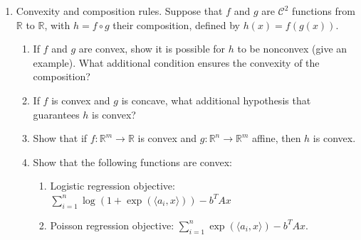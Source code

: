 \documentclass[11pt]{amsart}
\newcommand{\cC}{\mathcal{C}}
\begin{document}
\begin{enumerate}
\begin{enumerate}
\item Any norm (see Chapter 1 for definition of a norm).

  \begin{proof}
    Let $\lVert \cdot \rVert$ be a norm, meaning that it satisfies
    \emph{absolute homogeneity} and the \emph{triangle inequality}. We have that
    \begin{align*}
      \lVert \lambda x + (1 - \lambda)y \rVert
      &\leq \lVert \lambda x \rVert + \lVert (1 - \lambda)y \rVert
      = \lambda \lVert x \rVert + (1 - \lambda)\lVert y \rVert
    \end{align*}
    for all $\lambda \in [0, 1]$, where we first apply the triangle inequality
    and then absolute homogeneity. By defintion, $\lVert \cdot \rVert$ is convex.
  \end{proof}

\end{enumerate}

\bigskip\bigskip




\item  Convexity and composition rules. Suppose that $f$ and $g$ are $\cC^2$ functions from $\mathbb{R}$ to $\mathbb{R}$, with $h = f\circ g$ their composition, defined by 
\(
h(x) = f(g(x)).
\) 
\begin{enumerate}
\item If $f$ and $g$ are convex, show it is possible for $h$ to be nonconvex (give an example). What additional condition ensures 
the convexity of the composition? 
\item If $f$ is convex and $g$ is concave, what additional hypothesis that guarantees $h$ is convex? 
\item Show that if $f: \mathbb{R}^m \rightarrow \mathbb{R}$ is convex and $g: \mathbb{R}^n \rightarrow \mathbb{R}^m$ affine, then $h$ is convex. 
\item Show that the following functions are convex: 
\begin{enumerate}
\item Logistic regression objective: $\sum_{i=1}^n \log(1+\exp(\langle a_i, x\rangle))- b^TAx$
\item Poisson regression objective: $\sum_{i=1}^n \exp(\langle a_i, x \rangle) - b^TAx$. 
\end{enumerate}
\end{enumerate}




\end{enumerate}
\end{document}
